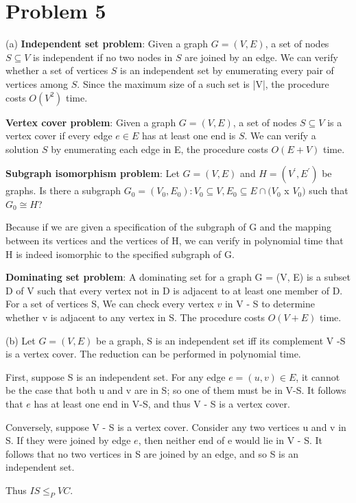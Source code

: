\documentclass[paper=a4, fontsize=12pt]{scrartcl} %
\numberwithin{equation}{section} %
\numberwithin{figure}{section} %
\numberwithin{table}{section} %
\begin{document}
\section*{Problem 5}
(a) \quad \textbf{Independent set problem}: Given a graph $G=(V,E)$, a set of nodes $S \subseteq V$ is independent if no two nodes in $S$ are joined by an edge. We can verify whether a set of vertices $S$ is an independent set by enumerating every pair of vertices among $S$. Since the maximum size of a such set is |V|, the procedure costs $O(V^2)$ time. \par
\textbf{Vertex cover problem}: Given a graph $G=(V,E)$, a set of nodes $S \subseteq V$ is a vertex cover if every edge $e \in E$ has at least one end is $S$.  We can verify a solution $S$ by enumerating each edge in E, the procedure costs $O(E+V)$ time. \par

\textbf{Subgraph isomorphism problem}: Let $G = (V, E)$ and $H = (V^{'}, E^{'})$ be graphs. Is there a subgraph $G_0 = (V_0, E_0): V_0 \subseteq V, E_0 \subseteq E \cap (V_0$ x $V_0) $ such that $G_0\cong H$? \par
Because if we are given a specification
of the subgraph of G and the mapping between its vertices and the vertices of H, we can
verify in polynomial time that H is indeed isomorphic to the specified subgraph of G. \par

\textbf{Dominating set problem}: A dominating set for a graph G = (V, E) is a subset D of V such that every vertex not in D is adjacent to at least one member of D.  For a set of vertices S, We can check every vertex $v$ in V - S to determine whether v is adjacent to any vertex in S. The procedure costs $O(V+E)$ time. \par\par 

(b) \quad Let $G = (V,E)$ be a graph, S is an independent set iff its complement V -S is a vertex cover. The reduction can be performed in polynomial time.\par
First, suppose S is an independent set. For any edge $e = (u,v)\in E$,  it cannot be the case that both u and v are in S; so one of them must be in V-S. It follows that $e$ has at least one end in V-S, and thus V - S is a vertex cover. \par
Conversely, suppose V - S is a vertex cover. Consider any two vertices u and v in S. If they were joined by edge $e$, then neither end of e would lie in V - S. It follows that no two vertices in S are joined by an edge, and so S is an independent set. \par
Thus $IS \leq_P VC$.
\end{document}
